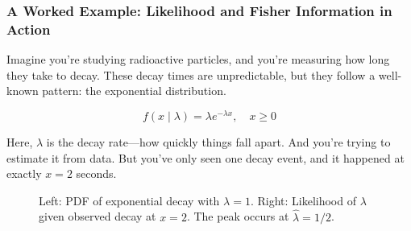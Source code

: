 \subsubsection{A Worked Example: Likelihood and Fisher Information in Action}

Imagine you're studying radioactive particles, and you're measuring how long they take to decay. These decay times are unpredictable, but they follow a well-known pattern: the exponential distribution.

\[
f(x \mid \lambda) = \lambda e^{-\lambda x}, \quad x \geq 0
\]

Here, \( \lambda \) is the decay rate—how quickly things fall apart. And you're trying to estimate it from data. But you’ve only seen one decay event, and it happened at exactly \( x = 2 \) seconds.

\begin{figure}[H]
\centering
{}
\caption{Left: PDF of exponential decay with \( \lambda = 1 \). Right: Likelihood of \( \lambda \) given observed decay at \( x = 2 \). The peak occurs at \( \hat{\lambda} = 1/2 \).}
\end{figure}


